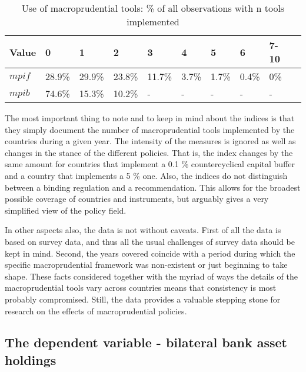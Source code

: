 \documentclass[12pt,a4paper]{article}
\begin{document}
\begin{table}[!h]
\centering
\begin{tabular}{ l l l l l l l l l l }
\hline
Value&0&1&2&3&4&5&6&7-10\\
\hline
$mpif$&28.9\%&29.9\%&23.8\%&11.7\%&3.7\%&1.7\%&0.4\%&0\% \\
$mpib$&74.6\%&15.3\%&10.2\%&-&-&-&-&- \\
\hline
\end{tabular}
\caption{Use of macroprudential tools: \% of all observations with n tools implemented}
\label{tab:mpiu_use}
\end{table}

The most important thing to note and to keep in mind about the indices is that they simply document the number of macroprudential tools implemented by the countries during a given year. The intensity of the measures is ignored as well as changes in the stance of the different policies. That is, the index changes by the same amount for countries that implement a 0.1 \% countercyclical capital buffer and a country that implements a 5 \% one. Also, the indices do not distinguish between a binding regulation and a recommendation. This allows for the broadest possible coverage of countries and instruments, but arguably gives a very simplified view of the policy field.  

In other aspects also, the data is not without caveats. First of all the data is based on survey data, and thus all the usual challenges of survey data should be kept in mind. Second, the years covered coincide with a period during which the specific macroprudential framework was non-existent or just beginning to take shape. These facts considered together with the myriad of ways the details of the macroprudential tools vary across countries means that consistency is most probably compromised. Still, the data provides a valuable stepping stone for research on the effects of macroprudential policies. 

\subsection{The dependent variable - bilateral bank asset holdings}
\end{document}
